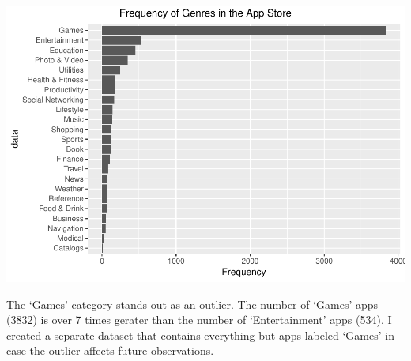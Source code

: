 \documentclass[]{article}
\newenvironment{Shaded}{\begin{snugshade}}{\end{snugshade}}
\newcommand{\CommentTok}[1]{\textcolor[rgb]{0.56,0.35,0.01}{\textit{#1}}}
\newcommand{\DataTypeTok}[1]{\textcolor[rgb]{0.13,0.29,0.53}{#1}}
\newcommand{\KeywordTok}[1]{\textcolor[rgb]{0.13,0.29,0.53}{\textbf{#1}}}
\newcommand{\NormalTok}[1]{#1}
\newcommand{\OperatorTok}[1]{\textcolor[rgb]{0.81,0.36,0.00}{\textbf{#1}}}
\newcommand{\StringTok}[1]{\textcolor[rgb]{0.31,0.60,0.02}{#1}}
\begin{document}
\begin{Shaded}
\end{Shaded}

\includegraphics{xtern_ds_report_files/figure-latex/analysis3-1.pdf}

The `Games' category stands out as an outlier. The number of `Games'
apps (3832) is over 7 times gerater than the number of `Entertainment'
apps (534). I created a separate dataset that contains everything but
apps labeled `Games' in case the outlier affects future observations.

\begin{Shaded}
\end{Shaded}
\end{document}
